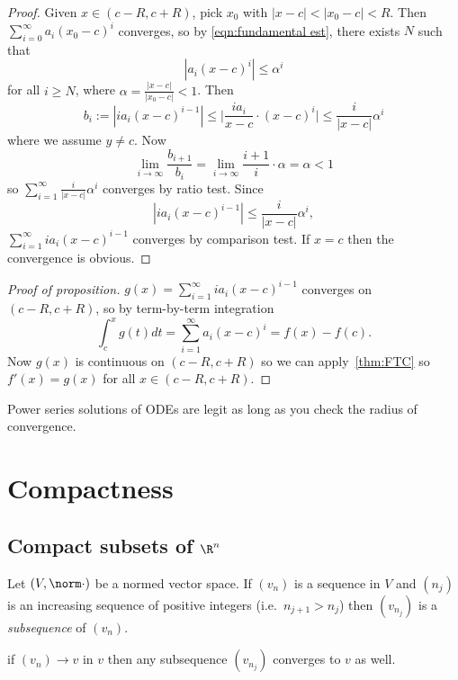 \documentclass[a4paper]{article}
\theoremstyle{definition}
\begin{document}
\begin{proof}
  Given \(x\in(c-R,c+R)\), pick \(x_0\) with \(|x-c| < |x_0-c| < R\). Then \(\sum_{i=0}^{\infty}a_i(x_0-c)^i \) converges, so by \ref{eqn:fundamental est}, there exists \(N\) such that
  \[
    |a_i(x-c)^i| \leq \alpha^i
  \]
  for all \(i\geq N\), where \(\alpha = \frac{|x-c|}{|x_0-c|}<1\). Then
  \[
    b_i:= |i a_i (x-c)^{i-1}| \leq \Big| \frac{i a_i}{x-c}\cdot(x-c)^i \Big| \leq \frac{i}{|x-c|}\alpha^i
  \]
  where we assume \(y\neq c\). Now
  \[
    \lim_{i\to\infty} \frac{b_{i+1}}{b_i} = \lim_{i\to\infty} \frac{i+1}{i}\cdot\alpha = \alpha<1
  \]
  so \(\sum_{i=1}^{\infty}\frac{i}{|x-c|}\alpha^i \) converges by ratio test. Since
  \[
    |i a_i(x-c)^{i-1}| \leq \frac{i}{|x-c|}\alpha^i,
  \]
  \(\sum_{i=1}^{\infty}i a_i(x-c)^{i-1} \) converges by comparison test. If \(x=c\) then the convergence is obvious.
\end{proof}

\begin{proof}[Proof of proposition]
  \(g(x) = \sum_{i=1}^{\infty}i a_i (x-c)^{i-1} \) converges on \((c-R,c+R)\), so by term-by-term integration
  \[
    \int_{c}^{x} g(t) dt = \sum_{i=1}^{\infty}a_i(x-c)^i = f(x) - f(c).
  \]
  Now \(g(x)\) is continuous on \((c-R, c+R)\) so we can apply~\ref{thm:FTC} so \(f'(x) = g(x)\) for all \(x\in(c-R,c+R)\).
\end{proof}

\begin{application}
  Power series solutions of ODEs are legit as long as you check the radius of convergence.
\end{application}

\section{Compactness}

\subsection{Compact subsets of \texorpdfstring{\(\R^n\)}{R\^{}n}}

Let \((V, \norm \cdot)\) be a normed vector space. If \((v_n)\) is a sequence in \(V\) and \((n_j)\) is an increasing sequence of positive integers (i.e.\ \(n_{j+1}>n_j\)) then \((v_{n_j})\) is a \emph{subsequence} of \((v_n)\).

\begin{ex}
  if \((v_n)\to v\) in \(v\) then any subsequence \((v_{n_j})\) converges to \(v\) as well.
\end{ex}
\end{document}
